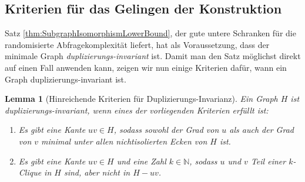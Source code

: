 \documentclass[10pt,a4paper, footheight=1mm, bibliography=totoc]{scrreprt}
\newtheorem{Lemma}[definition]{Lemma}
\theoremstyle{definition}
\begin{document}
\subsection{Kriterien für das Gelingen der Konstruktion}
Satz \ref{thm:SubgraphIsomorphismLowerBound}, der gute
untere Schranken für die randomisierte Abfragekomplexität
liefert, hat als Voraussetzung, dass der minimale Graph
\emph{duplizierungs-invariant} ist. Damit man den 
Satz möglichst direkt auf einen Fall anwenden kann, 
zeigen wir nun einige Kriterien dafür, wann ein
Graph duplizierungs-invariant ist.
\begin{Lemma}[Hinreichende Kriterien für Duplizierungs-Invarianz]
\label{thm:KriterienDuplizierungsInvariant}
Ein Graph $H$ ist duplizierungs-invariant, wenn eines
der vorliegenden Kriterien erfüllt ist:
\begin{enumerate}[label=\textbf{\emph{(\alph*)}}, leftmargin=*]
\item Es gibt eine Kante $uv\in H$, sodass sowohl
           der Grad von $u$ als auch der Grad von $v$
           minimal unter allen nichtisolierten Ecken von $H$ ist.
\item Es gibt eine Kante $uv \in H$ und eine Zahl
           $k\in \mathbb{N}$, sodass $u$ und $v$
           Teil einer $k$-Clique in $H$ sind, aber nicht
           in $H-uv$.
\end{enumerate}
\end{Lemma}
\end{document}
